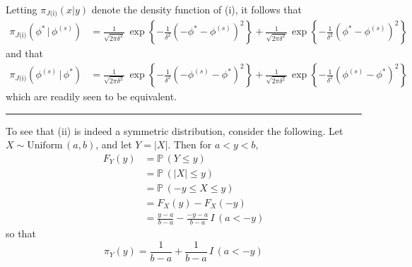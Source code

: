 \documentclass[11pt]{article}
\newcommand{\prob}{\mathbb{P}\,}
\newcommand{\barS}{\,|\,}
\newcommand{\ind}{I}
\begin{document}
\noindent Letting $\pi_{J\text{(i)}} \left( x | y \right)$ denote the density function of (i), it follows that 
\begin{align*}
\pi_{J\text{(i)}} \left( \phi^* \barS \phi^{(s)} \right) &= \frac{ 1 }{ \sqrt{ 2\pi\delta^2 } }\, \exp\left\{ - \frac{ 1 }{ \delta^2 } \left(-\phi^* - \phi^{(s)}\right)^2 \right\} + \frac{ 1 }{ \sqrt{ 2\pi\delta^2 } }\, \exp\left\{ - \frac{ 1 }{ \delta^2 } \left(\phi^* - \phi^{(s)}\right)^2 \right\}
\end{align*}
and that
\begin{align*}
\pi_{J\text{(i)}} \left( \phi^{(s)} \barS \phi^* \right) &= \frac{ 1 }{ \sqrt{ 2\pi\delta^2 } }\, \exp\left\{ - \frac{ 1 }{ \delta^2 } \left(-\phi^{(s)} - \phi^*\right)^2 \right\} + \frac{ 1 }{ \sqrt{ 2\pi\delta^2 } }\, \exp\left\{ - \frac{ 1 }{ \delta^2 } \left(\phi^{(s)} - \phi^*\right)^2 \right\}
\end{align*}
which are readily seen to be equivalent.





\vspace{4mm} \begin{center} \rule{1.0\textwidth}{0.25mm} \end{center} \vspace{4mm}
\noindent To see that (ii) is indeed a symmetric distribution, consider the following.  Let $X \sim \text{Uniform}\, (a,b)$, and let $Y = |X|$.  Then for $a < y < b$,
\begin{align*}
F_Y(y) &= \prob(Y \leq y) \\[1ex]
&= \prob(|X| \leq y) \\[1ex]
&= \prob(-y \leq X \leq y) \\[1ex]
&= F_X(y) - F_X(-y) \\[1ex]
&= \frac{ y-a }{ b-a } - \frac{ -y-a }{ b-a }\, \ind\,(a < -y)
\end{align*}
so that
\[ \pi_Y(y) = \frac{ 1 }{ b-a } + \frac{ 1 }{ b - a }\, \ind\,(a < -y)  \] \vspace{4mm}
\end{document}
